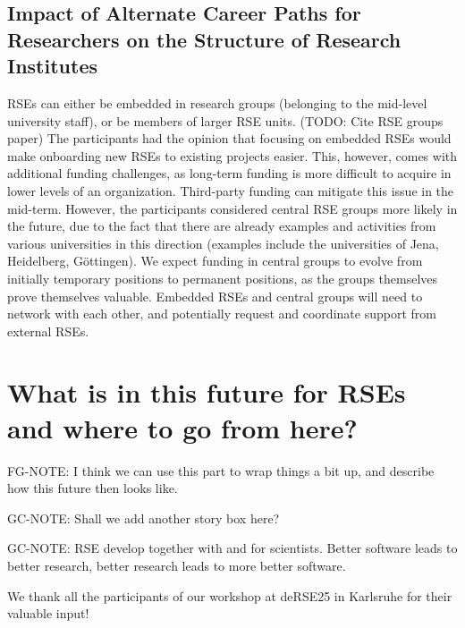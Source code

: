 \documentclass{eceasst}
\begin{document}
\subsection{Impact of Alternate Career Paths for Researchers on the Structure of Research Institutes}

RSEs can either be embedded in research groups (belonging to the mid-level university staff),
or be members of larger RSE units. (TODO: Cite RSE groups paper)
The participants had the opinion that focusing on embedded RSEs would make onboarding new RSEs to existing projects easier.
This, however, comes with additional funding challenges,
as long-term funding is more difficult to acquire in lower levels of an organization.
Third-party funding can mitigate this issue in the mid-term.
However, the participants considered central RSE groups more likely in the future,
due to the fact that there are already examples and activities from various universities in this direction
(examples include the universities of Jena, Heidelberg, Göttingen).
We expect funding in central groups to evolve from initially temporary positions to permanent positions,
as the groups themselves prove themselves valuable.
Embedded RSEs and central groups will need to network with each other,
and potentially request and coordinate support from external RSEs.


\section{What is in this future for RSEs and where to go from here?}
FG-NOTE: I think we can use this part to wrap things a bit up, and describe how this future then looks like.

GC-NOTE: Shall we add another story box here?

GC-NOTE: RSE develop together with and for scientists.
Better software leads to better research,
better research leads to more better software.

\begin{acknowledge}
We thank all the participants of our workshop at deRSE25 in Karlsruhe for their valuable input!
\end{acknowledge}

%
%
\end{document}
